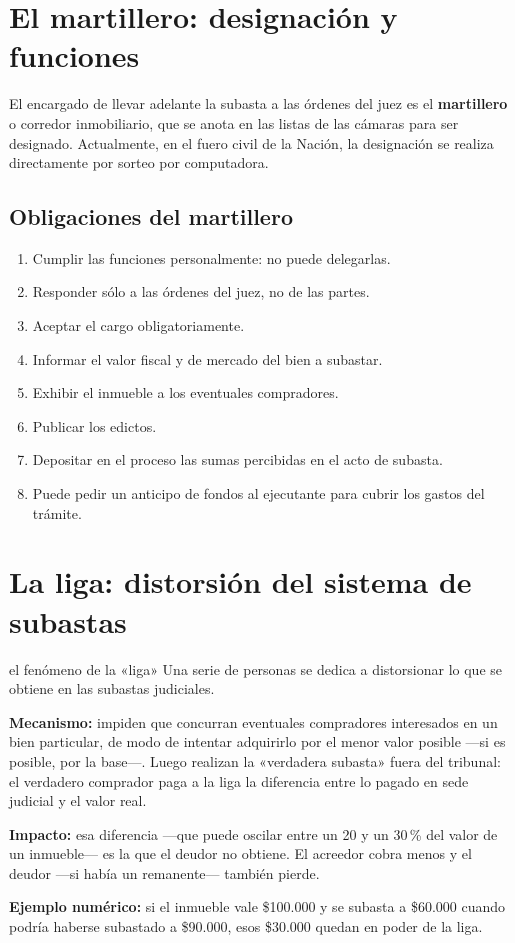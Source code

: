\documentclass[12pt,oneside]{book}
\begin{document}
\section{El martillero: designación y funciones}

El encargado de llevar adelante la subasta a las órdenes del juez es el \textbf{martillero} o corredor inmobiliario, que se anota en las listas de las cámaras para ser designado. Actualmente, en el fuero civil de la Nación, la designación se realiza directamente por sorteo por computadora.

\subsection{Obligaciones del martillero}

\begin{enumerate}
    \item Cumplir las funciones personalmente: no puede delegarlas.
    \item Responder sólo a las órdenes del juez, no de las partes.
    \item Aceptar el cargo obligatoriamente.
    \item Informar el valor fiscal y de mercado del bien a subastar.
    \item Exhibir el inmueble a los eventuales compradores.
    \item Publicar los edictos.
    \item Depositar en el proceso las sumas percibidas en el acto de subasta.
    \item Puede pedir un anticipo de fondos al ejecutante para cubrir los gastos del trámite.
\end{enumerate}

\section{La liga: distorsión del sistema de subastas}

\begin{example}{el fenómeno de la «liga»}
Una serie de personas se dedica a distorsionar lo que se obtiene en las subastas judiciales.

\textbf{Mecanismo:} impiden que concurran eventuales compradores interesados en un bien particular, de modo de intentar adquirirlo por el menor valor posible ---si es posible, por la base---. Luego realizan la «verdadera subasta» fuera del tribunal: el verdadero comprador paga a la liga la diferencia entre lo pagado en sede judicial y el valor real.

\textbf{Impacto:} esa diferencia ---que puede oscilar entre un 20 y un 30\,\% del valor de un inmueble--- es la que el deudor no obtiene. El acreedor cobra menos y el deudor ---si había un remanente--- también pierde.

\textbf{Ejemplo numérico:} si el inmueble vale \$100.000 y se subasta a \$60.000 cuando podría haberse subastado a \$90.000, esos \$30.000 quedan en poder de la liga.
\end{example}
\end{document}
